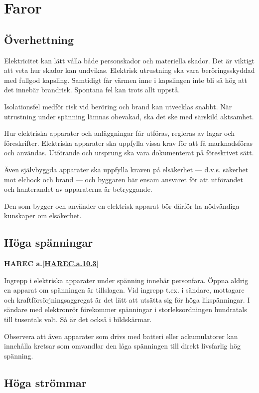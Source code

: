 \section{Faror}

\subsection{Överhettning}

Elektricitet kan lätt vålla både personskador och materiella
skador. Det är viktigt att veta hur skador kan undvikas. Elektrisk
utrustning ska vara beröringsskyddad med fullgod kapsling. Samtidigt
får värmen inne i kapslingen inte bli så hög att det innebär
brandrisk. Spontana fel kan trots allt uppstå.

Isolationsfel medför risk vid beröring och brand kan utvecklas snabbt.
När utrustning under spänning lämnas obevakad, ska det ske med särskild
aktsamhet.

Hur elektriska apparater och anläggningar får utföras, regleras av
lagar och föreskrifter. Elektriska apparater ska uppfylla vissa krav
för att få marknadsföras och användas. Utförande och ursprung ska
vara dokumenterat på föreskrivet sätt.

Även självbyggda apparater ska uppfylla kraven på elsäkerhet ---
d.v.s. säkerhet mot elchock och brand --- och byggaren bär ensam
ansvaret för att utförandet och hanterandet av apparaterna är
betryggande.

Den som bygger och använder en elektrisk apparat bör därför ha
nödvändiga kunskaper om elsäkerhet.

\subsection{Höga spänningar}
\textbf{
HAREC a.\ref{HAREC.a.10.3}\label{myHAREC.a.10.3}
}

Ingrepp i elektriska apparater under spänning innebär
personfara. Öppna aldrig en apparat om spänningen är tillslagen. Vid
ingrepp t.ex. i sändare, mottagare och kraftförsörjningsaggregat är
det lätt att utsätta sig för höga likspänningar. I sändare med
elektronrör förekommer spänningar i storleksordningen hundratals till
tusentals volt. Så är det också i bildskärmar.

Observera att även apparater som drivs med batteri eller ackumulatorer
kan innehålla kretsar som omvandlar den låga spänningen till direkt
livsfarlig hög spänning.

\subsection{Höga strömmar}

